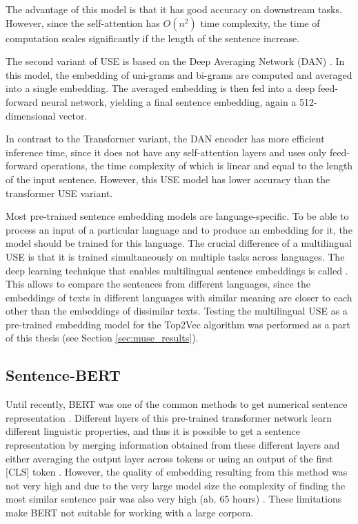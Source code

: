 \documentclass[fontsize=12pt,a4paper,twoside,openany]{scrbook}
\begin{document}
The advantage of this model is that it has good accuracy on downstream tasks. However, since the self-attention has \(O(n^2)\) time complexity, the time of computation scales significantly if the length of the sentence increase.

The second variant of USE is based on the Deep Averaging Network (DAN) \parencite{Iyyer15}. In this model, the embedding of uni-grams and bi-grams are computed and averaged into a single embedding. The averaged embedding is then fed into a deep feed-forward neural network, yielding a final sentence embedding, again a 512-dimensional vector.

In contrast to the Transformer variant, the DAN encoder has more efficient inference time, since it does not have any self-attention layers and uses only feed-forward operations, the time complexity of which is linear and equal to the length of the input sentence. However, this USE model has lower accuracy than the transformer USE variant. 

Most pre-trained sentence embedding models are language-specific. To be able to process an input of a particular language and to produce an embedding for it, the model should be trained for this language. The crucial difference of a multilingual USE is that it is trained simultaneously on multiple tasks across languages. The deep learning technique that enables multilingual sentence embeddings is called  \parencite{Chidambaram19}. This allows to compare the sentences from different languages, since the embeddings of texts in different languages with similar meaning are closer to each other than the embeddings of dissimilar texts. 
Testing the multilingual USE as a pre-trained embedding model for the Top2Vec algorithm was performed as a part of this thesis (see Section \ref{sec:muse_results}).

\subsection{Sentence-BERT}
\label{sec:sbert}

Until recently, BERT was one of the common methods to get numerical sentence representation \parencite{Devlin19}. Different layers of this pre-trained transformer network learn different linguistic properties, and thus it is possible to get a sentence representation by merging information obtained from these different layers and either averaging the output layer across tokens or using an output of the first [CLS] token \parencite{Wang20}. However, the quality of embedding resulting from this method was not very high and due to the very large model size the complexity of finding the most similar sentence pair was also very high (ab. 65 hours) \parencite{Reimers19}. These limitations make BERT not suitable for working with a large corpora.
\end{document}
